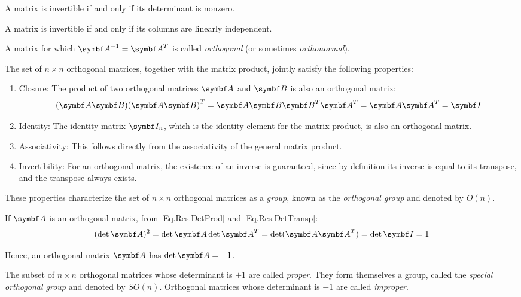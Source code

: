 A matrix is invertible if and only if its determinant is nonzero.

A matrix is invertible if and only if its columns are linearly independent. %

A matrix for which $\inv{\mat{A}}=\tr{\mat{A}}$ is called \emph{orthogonal} (or sometimes \emph{orthonormal}). 

The set of $n\times n$ orthogonal matrices, together with the matrix product, jointly satisfy the following properties:
\begin{enumerate}
\item Closure: The product of two orthogonal matrices $\mat{A}$ and $\mat{B}$ is also an orthogonal matrix:
	\begin{equation*}
	(\mat{A}\mat{B})\tr{(\mat{A}\mat{B})}=\mat{A}\mat{B}\tr{\mat{B}}\tr{\mat{A}}=\mat{A}\tr{\mat{A}}=\IdM	
	\end{equation*}
\item Identity: The identity matrix $\IdM_{n}$, which is the identity element for the matrix product, is also an orthogonal matrix.
\item Associativity: This follows directly from the associativity of the general matrix product.
\item Invertibility: For an orthogonal matrix, the existence of an inverse is guaranteed, since by definition its inverse is equal to its transpose, and the transpose always exists.
\end{enumerate}

These properties characterize the set of $n \times n$ orthogonal matrices as a \emph{group}, known as the \emph{orthogonal group} and denoted by $O(n)$.

If $\mat{A}$ is an orthogonal matrix, from \eqref{Eq.Res.DetProd} and \eqref{Eq.Res.DetTransp}:
\begin{equation*}
	(\det\mat{A})^{2}=\det\mat{A}\det\tr{\mat{A}}=\det(\mat{A}\tr{\mat{A}})=\det\IdM=1
\end{equation*}

Hence, an orthogonal matrix $\mat{A}$ has $\det\mat{A}=\pm 1$.

The subset of $n\times n$ orthogonal matrices whose determinant is $+1$ are called \emph{proper}. They form themselves a group, called the \emph{special orthogonal group} and denoted by $SO(n)$. Orthogonal matrices whose determinant is $-1$ are called \emph{improper}.

